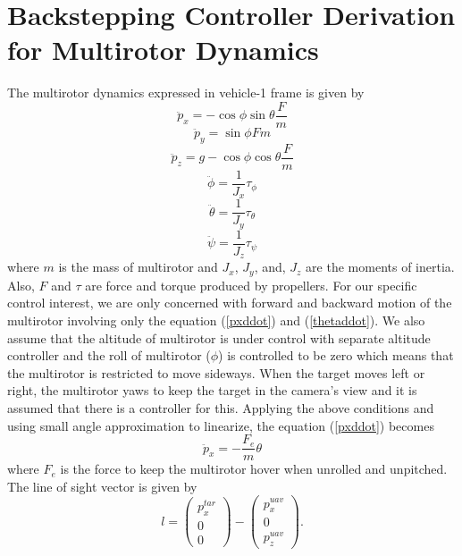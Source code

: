 \section{Backstepping Controller Derivation for Multirotor Dynamics}
The multirotor dynamics expressed in vehicle-1 frame is given by 
\begin{equation}
\ddot{p}_x=-\cos\phi\sin\theta\frac{F}{m}
\label{pxddot}
\end{equation}
\begin{equation}
\ddot{p}_y=\sin\phi{F}{m}
\end{equation}
\begin{equation}
\ddot{p}_z=g-\cos\phi\cos\theta\frac{F}{m}
\end{equation}
\begin{equation}
\ddot{\phi}=\frac{1}{J_x}\tau_{\phi}
\end{equation}
\begin{equation}
\ddot{\theta}=\frac{1}{J_y}\tau_{\theta}
\label{thetaddot}
\end{equation}
\begin{equation}
\ddot{\psi}=\frac{1}{J_z}\tau_{\psi}
\end{equation}
where $m$ is the mass of multirotor and $J_x$, $J_y$, and, $J_z$ are the moments of inertia. Also, $F$ and $\tau$ are force and torque produced by propellers. For our specific control interest, we are only concerned with forward and backward motion of the multirotor involving only the equation (\ref{pxddot}) and (\ref{thetaddot}). We also assume that the altitude of multirotor is under control with separate altitude controller and the roll of multirotor ($\phi$) is controlled to be zero which means that the multirotor is restricted to move sideways. When the target moves left or right, the multirotor yaws to keep the target in the camera's view and it is assumed that there is a controller for this. Applying the above conditions and using small angle approximation to linearize, the equation (\ref{pxddot}) becomes 
\begin{equation}
\ddot{p}_x=-\frac{F_e}{m}\theta
\end{equation}
where $F_e$ is the force to keep the multirotor hover when unrolled and unpitched. The line of sight vector is given by 
\begin{equation}
l=\begin{pmatrix}
p_x^{tar} \\ 0 \\ 0
\end{pmatrix}
-\begin{pmatrix}
p_x^{uav} \\ 0 \\ p_z^{uav}
\end{pmatrix}.
\label{l}
\end{equation}
